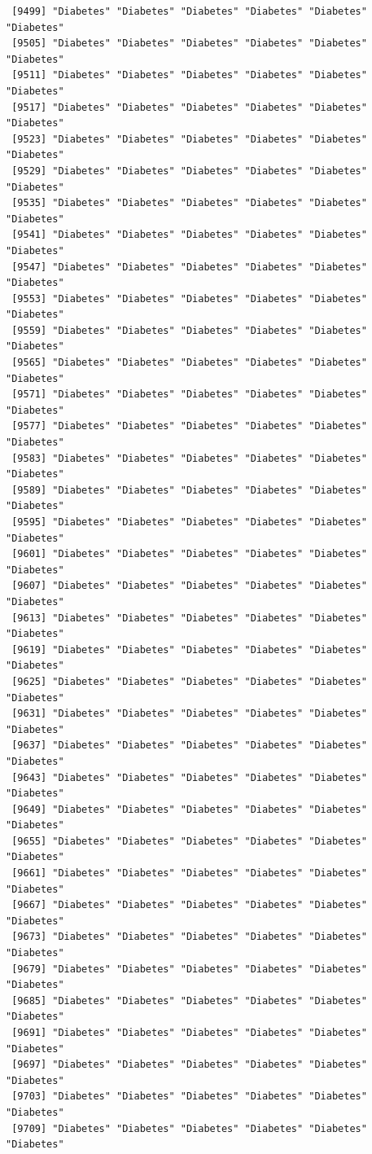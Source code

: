 \documentclass[
  letterpaper,
  DIV=11,
  numbers=noendperiod]{scrartcl}
\begin{document}
\begin{verbatim}
 [9499] "Diabetes" "Diabetes" "Diabetes" "Diabetes" "Diabetes" "Diabetes"
 [9505] "Diabetes" "Diabetes" "Diabetes" "Diabetes" "Diabetes" "Diabetes"
 [9511] "Diabetes" "Diabetes" "Diabetes" "Diabetes" "Diabetes" "Diabetes"
 [9517] "Diabetes" "Diabetes" "Diabetes" "Diabetes" "Diabetes" "Diabetes"
 [9523] "Diabetes" "Diabetes" "Diabetes" "Diabetes" "Diabetes" "Diabetes"
 [9529] "Diabetes" "Diabetes" "Diabetes" "Diabetes" "Diabetes" "Diabetes"
 [9535] "Diabetes" "Diabetes" "Diabetes" "Diabetes" "Diabetes" "Diabetes"
 [9541] "Diabetes" "Diabetes" "Diabetes" "Diabetes" "Diabetes" "Diabetes"
 [9547] "Diabetes" "Diabetes" "Diabetes" "Diabetes" "Diabetes" "Diabetes"
 [9553] "Diabetes" "Diabetes" "Diabetes" "Diabetes" "Diabetes" "Diabetes"
 [9559] "Diabetes" "Diabetes" "Diabetes" "Diabetes" "Diabetes" "Diabetes"
 [9565] "Diabetes" "Diabetes" "Diabetes" "Diabetes" "Diabetes" "Diabetes"
 [9571] "Diabetes" "Diabetes" "Diabetes" "Diabetes" "Diabetes" "Diabetes"
 [9577] "Diabetes" "Diabetes" "Diabetes" "Diabetes" "Diabetes" "Diabetes"
 [9583] "Diabetes" "Diabetes" "Diabetes" "Diabetes" "Diabetes" "Diabetes"
 [9589] "Diabetes" "Diabetes" "Diabetes" "Diabetes" "Diabetes" "Diabetes"
 [9595] "Diabetes" "Diabetes" "Diabetes" "Diabetes" "Diabetes" "Diabetes"
 [9601] "Diabetes" "Diabetes" "Diabetes" "Diabetes" "Diabetes" "Diabetes"
 [9607] "Diabetes" "Diabetes" "Diabetes" "Diabetes" "Diabetes" "Diabetes"
 [9613] "Diabetes" "Diabetes" "Diabetes" "Diabetes" "Diabetes" "Diabetes"
 [9619] "Diabetes" "Diabetes" "Diabetes" "Diabetes" "Diabetes" "Diabetes"
 [9625] "Diabetes" "Diabetes" "Diabetes" "Diabetes" "Diabetes" "Diabetes"
 [9631] "Diabetes" "Diabetes" "Diabetes" "Diabetes" "Diabetes" "Diabetes"
 [9637] "Diabetes" "Diabetes" "Diabetes" "Diabetes" "Diabetes" "Diabetes"
 [9643] "Diabetes" "Diabetes" "Diabetes" "Diabetes" "Diabetes" "Diabetes"
 [9649] "Diabetes" "Diabetes" "Diabetes" "Diabetes" "Diabetes" "Diabetes"
 [9655] "Diabetes" "Diabetes" "Diabetes" "Diabetes" "Diabetes" "Diabetes"
 [9661] "Diabetes" "Diabetes" "Diabetes" "Diabetes" "Diabetes" "Diabetes"
 [9667] "Diabetes" "Diabetes" "Diabetes" "Diabetes" "Diabetes" "Diabetes"
 [9673] "Diabetes" "Diabetes" "Diabetes" "Diabetes" "Diabetes" "Diabetes"
 [9679] "Diabetes" "Diabetes" "Diabetes" "Diabetes" "Diabetes" "Diabetes"
 [9685] "Diabetes" "Diabetes" "Diabetes" "Diabetes" "Diabetes" "Diabetes"
 [9691] "Diabetes" "Diabetes" "Diabetes" "Diabetes" "Diabetes" "Diabetes"
 [9697] "Diabetes" "Diabetes" "Diabetes" "Diabetes" "Diabetes" "Diabetes"
 [9703] "Diabetes" "Diabetes" "Diabetes" "Diabetes" "Diabetes" "Diabetes"
 [9709] "Diabetes" "Diabetes" "Diabetes" "Diabetes" "Diabetes" "Diabetes"

\end{verbatim}
\end{document}

